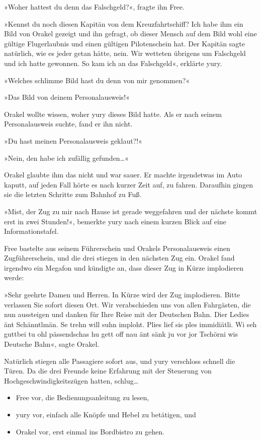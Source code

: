»Woher hattest du denn das Falschgeld?«, fragte ihn Free.

»Kennst du noch diesen Kapitän von dem Kreuzfahrtschiff? Ich habe ihm ein Bild von Orakel gezeigt und ihn gefragt, ob dieser Mensch auf dem Bild wohl eine gültige Flugerlaubnis und einen gültigen Pilotenschein hat. Der Kapitän sagte natürlich, wie es jeder getan hätte, nein. Wir wetteten übrigens um Falschgeld und ich hatte gewonnen. So kam ich an das Falschgeld«, erklärte yury.

»Welches schlimme Bild hast du denn von mir genommen?«

»Das Bild von deinem Personalausweis!«

Orakel wollte wissen, woher yury dieses Bild hatte. Als er nach seinem Personalausweis suchte, fand er ihn nicht.

»Du hast meinen Personalausweis geklaut?!«

»Nein, den habe ich zufällig gefunden…«

Orakel glaubte ihm das nicht und war sauer. Er machte irgendetwas im Auto kaputt, auf jeden Fall hörte es nach kurzer Zeit auf, zu fahren. Daraufhin gingen sie die letzten Schritte zum Bahnhof zu Fuß.

»Mist, der Zug zu mir nach Hause ist gerade weggefahren und der nächste kommt erst in zwei Stunden!«, bemerkte yury nach einem kurzen Blick auf eine Informationstafel.

Free bastelte aus seinem Führerschein und Orakels Personalausweis einen Zugführerschein, und die drei stiegen in den nächsten Zug ein. Orakel fand irgendwo ein Megafon und kündigte an, dass dieser Zug in Kürze implodieren werde:

»Sehr geehrte Damen und Herren. In Kürze wird der Zug implodieren. Bitte verlassen Sie sofort diesen Ort. Wir verabschieden uns von allen Fahrgästen, die nun aussteigen und danken für Ihre Reise mit der Deutschen Bahn. Dier Ledies änt Schänntlmän. Se trehn will suhn imploht. Plies lief sis ples immidiätli. Wi seh guttbei tu ohl pässendschas hu gett off nau änt sänk ju vor jor Tschörni wis Deutsche Bahn«, sagte Orakel.

Natürlich stiegen alle Passagiere sofort aus, und yury verschloss schnell die Türen. Da die drei Freunde keine Erfahrung mit der Steuerung von Hochgeschwindigkeitszügen hatten, schlug…

\begin{itemize}
\item Free vor, die Bedienungsanleitung zu lesen,
\item yury vor, einfach alle Knöpfe und Hebel zu betätigen, und
\item Orakel vor, erst einmal ins Bordbistro zu gehen.
\end{itemize}

